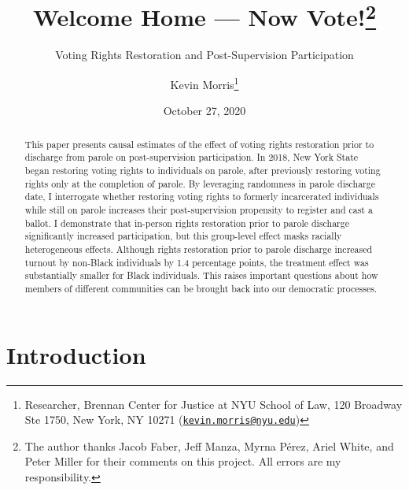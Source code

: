 \documentclass[
  12pt,
]{article}
\title{Welcome Home --- Now Vote!\thanks{The author thanks Jacob Faber, Jeff Manza, Myrna Pérez, Ariel White, and Peter Miller for their comments on this project. All errors are my responsibility.}}
\subtitle{Voting Rights Restoration and Post-Supervision Participation}
\author{Kevin Morris\footnote{Researcher, Brennan Center for Justice at NYU School of Law, 120 Broadway Ste 1750, New York, NY 10271 (\href{mailto:kevin.morris@nyu.edu}{\nolinkurl{kevin.morris@nyu.edu}})}}
\date{October 27, 2020}
\begin{document}
\maketitle
\begin{abstract}
This paper presents causal estimates of the effect of voting rights restoration prior to discharge from parole on post-supervision participation. In 2018, New York State began restoring voting rights to individuals on parole, after previously restoring voting rights only at the completion of parole. By leveraging randomness in parole discharge date, I interrogate whether restoring voting rights to formerly incarcerated individuals while still on parole increases their post-supervision propensity to register and cast a ballot. I demonstrate that in-person rights restoration prior to parole discharge significantly increased participation, but this group-level effect masks racially heterogeneous effects. Although rights restoration prior to parole discharge increased turnout by non-Black individuals by 1.4 percentage points, the treatment effect was substantially smaller for Black individuals. This raises important questions about how members of different communities can be brought back into our democratic processes.
\end{abstract}

\pagebreak
\doublespacing


\hypertarget{introduction}{%
\section*{Introduction}\label{introduction}}
\end{document}
